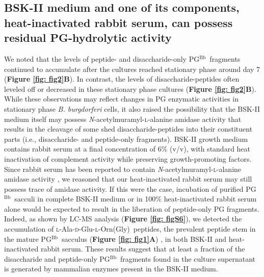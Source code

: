 \documentclass[twoside, watermark]{zHenriquesLab-StyleBioRxiv}
\newcommand{\pgbb}{PG$^\text{Bb}$}
\newcommand{\AEOG}{\textsc{l}-Ala-\textsc{d}-Glu-\textsc{l}-Orn(Gly)}
\newcommand{\scl}{\textsc{l}} %
\begin{document}
\subsection*{BSK-II medium and one of its components, heat-inactivated rabbit serum, can possess residual PG-hydrolytic activity}
We noted that the levels of peptide- and disaccharide-only \pgbb~fragments continued to accumulate after the cultures reached stationary phase around day 7 (\textbf{Figure \ref{fig: fig2}B}). In contrast, the levels of disaccharide-peptides often leveled off or decreased in these stationary phase cultures (\textbf{Figure \ref{fig: fig2}B}). While these observations may reflect changes in PG enzymatic activities in stationary phase \textit{B. burgdorferi} cells, it also raised the possibility that the BSK-II medium itself may possess \textit{N}-acetylmuramyl-\scl-alanine amidase activity that results in the cleavage of some shed disaccharide-peptides into their constituent parts (i.e., disaccharide- and peptide-only fragments). BSK-II growth medium contains rabbit serum at a final concentration of 6\% (v/v), with standard heat inactivation of complement activity while preserving growth-promoting factors. Since rabbit serum has been reported to contain \textit{N}-acetylmuramyl-\scl-alanine amidase activity \cite{Valinger1982}, we reasoned that our heat-inactivated rabbit serum may still possess trace of amidase activity. If this were the case, incubation of purified \pgbb~sacculi in complete BSK-II medium or in 100\% heat-inactivated rabbit serum alone would be expected to result in the liberation of peptide-only PG fragments. Indeed, as shown by LC-MS analysis (\textbf{Figure \ref{fig: figS6}}), we detected the accumulation of \AEOG~peptides, the prevalent peptide stem in the mature \pgbb~sacculus (\textbf{Figure \ref{fig: fig1}A}) \cite{Jutras2019}, in both BSK-II and heat-inactivated rabbit serum. These results suggest that at least a fraction of the disaccharide and peptide-only \pgbb~fragments found in the culture supernatant is generated by mammalian enzymes present in the BSK-II medium.
\end{document}
